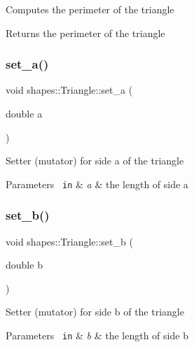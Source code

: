 Computes the perimeter of the triangle

\begin{DoxyReturn}{Returns}
the perimeter of the triangle 
\end{DoxyReturn}
\mbox{\label{classshapes_1_1Triangle_a66d51c6099afdebff6eaf7a1e71a6258}} 
\subsubsection{\texorpdfstring{set\_a()}{set\_a()}}
{\footnotesize\ttfamily void shapes\+::\+Triangle\+::set\+\_\+a (\begin{DoxyParamCaption}\item[{double}]{a }\end{DoxyParamCaption})}

Setter (mutator) for side a of the triangle


\begin{DoxyParams}[1]{Parameters}
\mbox{\texttt{ in}}  & {\em a} & the length of side a \\
\hline
\end{DoxyParams}
\mbox{\label{classshapes_1_1Triangle_a43fe7a0be28a62214ca3f4bdd84de65a}} 
\subsubsection{\texorpdfstring{set\_b()}{set\_b()}}
{\footnotesize\ttfamily void shapes\+::\+Triangle\+::set\+\_\+b (\begin{DoxyParamCaption}\item[{double}]{b }\end{DoxyParamCaption})}

Setter (mutator) for side b of the triangle


\begin{DoxyParams}[1]{Parameters}
\mbox{\texttt{ in}}  & {\em b} & the length of side b \\
\hline
\end{DoxyParams}
\mbox{\label{classshapes_1_1Triangle_add2da87e5cb6f9509b4b6e374a0dc0e1}} 

